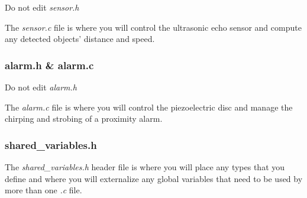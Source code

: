Do not edit \textit{sensor.h}

The \textit{sensor.c} file is where you will control the ultrasonic echo sensor and compute any detected objects' distance and speed.

\subsubsection{alarm.h \& alarm.c}

Do not edit \textit{alarm.h}

The \textit{alarm.c} file is where you will control the piezoelectric disc and manage the chirping and strobing of a proximity alarm.

\subsubsection{shared\_variables.h}

The \textit{shared\_variables.h} header file is where you will place any types that you define and where you will externalize any global variables that need to be used by more than one \textit{.c} file.
